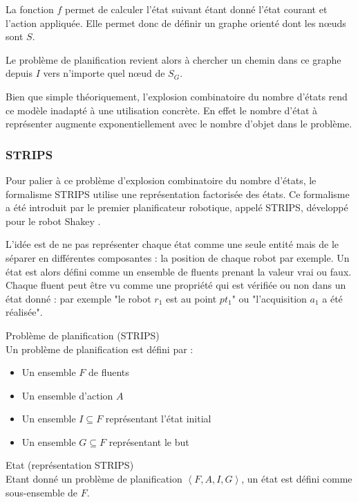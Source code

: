 La fonction $f$ permet de calculer l'état suivant étant donné l'état courant et l'action appliquée.
Elle permet donc de définir un graphe orienté dont les nœuds sont $S$.

Le problème de planification revient alors à chercher un chemin dans ce graphe depuis $I$ vers n'importe quel nœud de $S_G$.

Bien que simple théoriquement, l'explosion combinatoire du nombre d'états rend ce modèle inadapté à une utilisation concrète. En effet le nombre d'état à représenter augmente exponentiellement avec le nombre d'objet dans le problème.
\subsubsection{STRIPS}

Pour palier à ce problème d'explosion combinatoire du nombre d'états, le formalisme STRIPS \cite{STRIPS} utilise une représentation factorisée des états. Ce formalisme a été introduit par le premier planificateur robotique, appelé STRIPS, développé pour le robot Shakey \cite{Shakey}.

L'idée est de ne pas représenter chaque état comme une seule entité mais de le séparer en différentes composantes : la position de chaque robot par exemple. Un état est alors défini comme un ensemble de fluents prenant la valeur vrai ou faux. Chaque fluent peut être vu comme une propriété qui est vérifiée ou non dans un état donné : par exemple "le robot $r_1$ est au point $pt_1$" ou "l'acquisition $a_1$ a été réalisée".

\begin{definition}Problème de planification (STRIPS)\\
	\label{def:prb_strips}Un problème de planification est défini par :
	\begin{itemize}
		\item Un ensemble $F$ de fluents
		\item Un ensemble d'action $A$
		\item Un ensemble $I \subseteq F$ représentant l'état initial
		\item Un ensemble $G \subseteq F$ représentant le but
	\end{itemize}
\end{definition}

\begin{definition}Etat (représentation STRIPS)\\
	\label{def:etat_strips}
	Etant donné un problème de planification $\left<F,A,I,G\right>$, un état est défini comme sous-ensemble de $F$.
\end{definition}

